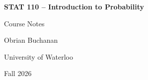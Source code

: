 \documentclass[11pt,letterpaper]{article}
\theoremstyle{definition}
\theoremstyle{plain}
\theoremstyle{remark}
\begin{document}

\begin{titlepage}

    \thispagestyle{empty}

    \vspace*{\fill}

    \begin{center}

        {\Huge\bfseries STAT 110 -- Introduction to Probability\par}

        \vspace{0.6cm}

        {\LARGE Course Notes\par}

        \vspace{0.4cm}

        {\Large Obrian Buchanan\par}

        \vspace{0.3cm}

        {\large University of Waterloo\par}

        \vspace{0.3cm}

        {\large Fall 2026\par}

    \end{center}

    \vspace*{\fill}

\end{titlepage}


\begin{titlepage}

    \thispagestyle{empty}

    \tableofcontents

\end{titlepage}


\setcounter{page}{1}



\newpage



\newpage


\end{document}
